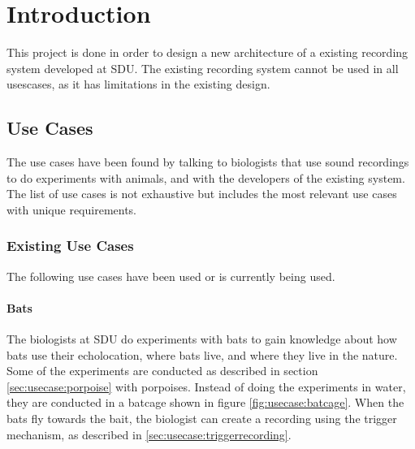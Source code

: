 \chapter{Introduction}

This project is done in order to design a new architecture of a existing recording system developed at SDU.  The existing recording system cannot be used in all usescases, as it has limitations in the existing design. 

\section{Use Cases}
The use cases have been found by talking to biologists that use sound recordings to do experiments with animals, and with the developers of the existing system. The list of use cases is not exhaustive but includes the most relevant use cases with unique requirements.

\subsection{Existing Use Cases}
The following use cases have been used or is currently being used.

\subsubsection{Bats}
The biologists at SDU do experiments with bats to gain knowledge about how bats use their echolocation, where bats live, and where they live in the nature.
Some of the experiments are conducted as described in section \ref{sec:usecase:porpoise} with porpoises. Instead of doing the experiments in water, they are conducted in a batcage shown in figure \ref{fig:usecase:batcage}. When the bats fly towards the bait, the biologist can create a recording using the trigger mechanism, as described in \ref{sec:usecase:triggerrecording}.

